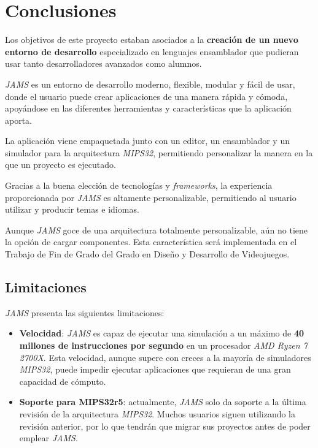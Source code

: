 \chapter{Conclusiones}\label{ch:conclusiones}

Los objetivos de este proyecto estaban asociados a la \textbf{creación
de un nuevo entorno de desarrollo} especializado en lenguajes
ensamblador que pudieran usar tanto desarrolladores avanzados
como alumnos.

\textit{JAMS} es un entorno de desarrollo moderno,
flexible, modular y fácil de usar, donde el usuario puede
crear aplicaciones de una manera rápida y cómoda,
apoyándose en las diferentes herramientas y
características que la aplicación aporta.

La aplicación viene empaquetada junto con un
editor, un ensamblador y un simulador para la arquitectura
\textit{MIPS32}, permitiendo personalizar la manera en la
que un proyecto es ejecutado.

Gracias a la buena elección de tecnologías y
\textit{frameworks}, la experiencia proporcionada por
\textit{JAMS} es altamente personalizable, permitiendo
al usuario utilizar y producir temas e idiomas.

Aunque \textit{JAMS} goce de una arquitectura
totalmente personalizable, aún no tiene la opción de cargar componentes.
Esta característica será implementada en el Trabajo de Fin de
Grado del Grado en Diseño y Desarrollo de Videojuegos.

\section{Limitaciones}\label{sec:limitaciones}

\textit{JAMS} presenta las siguientes limitaciones:

\begin{itemize}
    \item \textbf{Velocidad}: \textit{JAMS} es capaz de ejecutar
    una simulación a un máximo de \textbf{40 millones de instrucciones por segundo} en un
    procesador \textit{AMD Ryzen 7 2700X}.
    Esta velocidad, aunque supere con creces a la mayoría de simuladores \textit{MIPS32},
    puede impedir ejecutar aplicaciones que requieran de una gran capacidad de cómputo.
    \item \textbf{Soporte para MIPS32r5}: actualmente, \textit{JAMS} solo da soporte
    a la última revisión de la arquitectura \textit{MIPS32}.
    Muchos usuarios siguen utilizando la revisión anterior, por lo que tendrán que migrar
    sus proyectos antes de poder emplear \textit{JAMS}.
\end{itemize}

